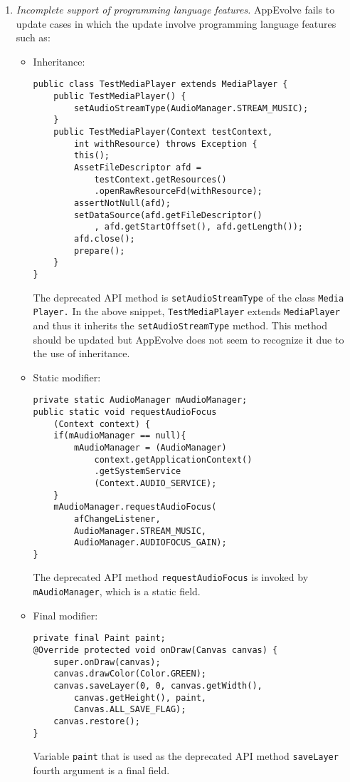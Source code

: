 \begin{enumerate}
\item {\em Incomplete support of programming language features.} AppEvolve fails to update cases in which the update involve programming language features such as:
\begin{itemize}
\item Inheritance:
\begin{lstlisting}[language=text,numbers=none,caption=Inherited deprecated method,captionpos=b, label=lst:inheritance]
public class TestMediaPlayer extends MediaPlayer {
    public TestMediaPlayer() {
        setAudioStreamType(AudioManager.STREAM_MUSIC);
    }
    public TestMediaPlayer(Context testContext, 
        int withResource) throws Exception {
        this();
        AssetFileDescriptor afd = 
            testContext.getResources()
            .openRawResourceFd(withResource);
        assertNotNull(afd);
        setDataSource(afd.getFileDescriptor()
            , afd.getStartOffset(), afd.getLength());
        afd.close();
        prepare();
    }
}
\end{lstlisting}
The deprecated API method is {\tt setAudioStreamType} of the class {\tt Media Player.} In the above snippet, {\tt TestMediaPlayer} extends {\tt MediaPlayer} and thus it inherits the {\tt setAudioStreamType} method. This method should be updated but AppEvolve does not seem to recognize it due to the use of inheritance.
\item Static modifier:
\begin{lstlisting}[language=text,numbers=none,caption=The object the deprecated method belongs to is a static field,captionpos=b, label=lst:static]
private static AudioManager mAudioManager;
public static void requestAudioFocus
    (Context context) {
    if(mAudioManager == null){
        mAudioManager = (AudioManager) 
            context.getApplicationContext()
            .getSystemService
            (Context.AUDIO_SERVICE);
    }
    mAudioManager.requestAudioFocus(
        afChangeListener,
        AudioManager.STREAM_MUSIC,
        AudioManager.AUDIOFOCUS_GAIN);
}
\end{lstlisting}
The deprecated API method {\tt requestAudioFocus} is invoked by {\tt mAudioManager}, which is a static field.

\item Final modifier:
\begin{lstlisting}[language=text,numbers=none,caption=The variable that is put as an argument of the deprecated method is a field with final modifier,captionpos=b, label=lst:final]
private final Paint paint;
@Override protected void onDraw(Canvas canvas) {
    super.onDraw(canvas);
    canvas.drawColor(Color.GREEN);
    canvas.saveLayer(0, 0, canvas.getWidth(),
        canvas.getHeight(), paint, 
        Canvas.ALL_SAVE_FLAG);
    canvas.restore();
}
\end{lstlisting}
Variable {\tt paint} that is used as the deprecated API method {\tt saveLayer} fourth argument is a final field.


\end{itemize}
\end{enumerate}
